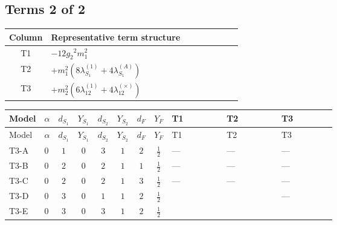 \documentclass[8pt]{article}
\begin{document}
\begin{landscape}
\subsection*{Terms 2 of 2}
\begin{center}
\begin{tabular}{@{}c >{\raggedright\arraybackslash}p{0.82\linewidth}@{}}
\toprule
Column & Representative term structure \\
\midrule
T1 & \(\displaystyle -12 {g_2}^2 {m_1^2}\) \\
\midrule
T2 & \(\displaystyle +{m_1^2} (8 {\lambda_{S_1}^{(1)}}+4 {\lambda_{S_1}^{(A)}})\) \\
\midrule
T3 & \(\displaystyle +{m_2^2} (6 {\lambda_{12}^{(1)}}+4 {\lambda_{12}^{(\times)}})\) \\
\midrule
\bottomrule
\end{tabular}
\end{center}
\smallskip
\tiny
\begin{longtable}{@{}llcccccc >{\raggedright\arraybackslash}p{0.21\linewidth} >{\raggedright\arraybackslash}p{0.21\linewidth} >{\raggedright\arraybackslash}p{0.21\linewidth}@{}}
\toprule
Model & $\alpha$ & $d_{S_1}$ & $Y_{S_1}$ & $d_{S_2}$ & $Y_{S_2}$ & $d_F$ & $Y_F$ & T1 & T2 & T3 \\
\midrule
\endfirsthead
\toprule
Model & $\alpha$ & $d_{S_1}$ & $Y_{S_1}$ & $d_{S_2}$ & $Y_{S_2}$ & $d_F$ & $Y_F$ & T1 & T2 & T3 \\
\midrule
\endhead
T3-A & $0$ & $1$ & $0$ & $3$ & $1$ & $2$ & $\frac{1}{2}$ & --- & --- & --- \\
\midrule
T3-B & $0$ & $2$ & $0$ & $2$ & $1$ & $1$ & $\frac{1}{2}$ & --- & --- & --- \\
\midrule
T3-C & $0$ & $2$ & $0$ & $2$ & $1$ & $3$ & $\frac{1}{2}$ & --- & --- & --- \\
\midrule
T3-D & $0$ & $3$ & $0$ & $1$ & $1$ & $2$ & $\frac{1}{2}$ & \scriptsize\adjustbox{max width=\linewidth}{$\begin{gathered} -12 {g_2}^2 {m_1^2}\end{gathered}$} & \scriptsize\adjustbox{max width=\linewidth}{$\begin{gathered} +{m_1^2} (8 {\lambda_{S_1}^{(1)}}+4 {\lambda_{S_1}^{(A)}})\end{gathered}$} & --- \\
\midrule
T3-E & $0$ & $3$ & $0$ & $3$ & $1$ & $2$ & $\frac{1}{2}$ & \scriptsize\adjustbox{max width=\linewidth}{$\begin{gathered} -12 {g_2}^2 {m_1^2}\end{gathered}$} & \scriptsize\adjustbox{max width=\linewidth}{$\begin{gathered} +{m_1^2} (8 {\lambda_{S_1}^{(1)}}+4 {\lambda_{S_1}^{(A)}})\end{gathered}$} & \scriptsize\adjustbox{max width=\linewidth}{$\begin{gathered} +{m_2^2} (6 {\lambda_{12}^{(1)}}+4 {\lambda_{12}^{(\times)}})\end{gathered}$} \\
\midrule
\bottomrule
\end{longtable}
\clearpage

\end{landscape}
\end{document}
